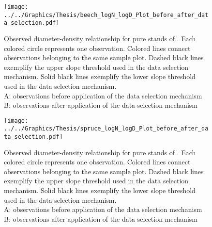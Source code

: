 \begin{figure}[H]
  \centering
  \texttt{[image: ../../Graphics/Thesis/beech\_logN\_logD\_Plot\_before\_after\_data\_selection.pdf]}
  \caption{Observed diameter-density relationship for pure stands of \beech{}.  Each colored circle represents one observation.  Colored lines connect observations belonging to the same sample plot.  Dashed black lines exemplify the upper slope threshold used in the data selection mechanism.  Solid black lines exemplify the lower slope threshold used in the data selection mechanism.  \\
    A: observations before application of the data selection mechanism \\
    B: observations after application of the data selection mechanism}
  \label{fig:beech_logN_logD_Plot_before_after_data_selection}
\end{figure}

\begin{figure}[H]
  \centering
  \texttt{[image: ../../Graphics/Thesis/spruce\_logN\_logD\_Plot\_before\_after\_data\_selection.pdf]}
  \caption{Observed diameter-density relationship for pure stands of \spruce{}.  Each colored circle represents one observation.  Colored lines connect observations belonging to the same sample plot.  Dashed black lines exemplify the upper slope threshold used in the data selection mechanism.  Solid black lines exemplify the lower slope threshold used in the data selection mechanism.  \\
    A: observations before application of the data selection mechanism \\
    B: observations after application of the data selection mechanism}
  \label{fig:spruce_logN_logD_Plot_before_after_data_selection}
\end{figure}



